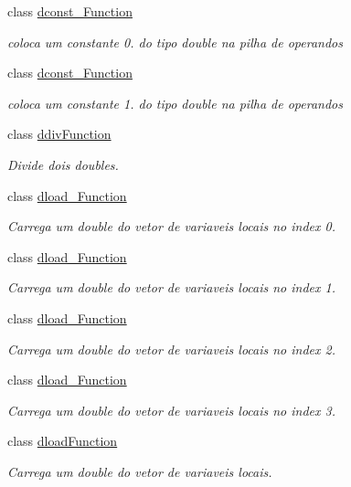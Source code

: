 \begin{DoxyCompactItemize}
class \hyperlink{classInstruction_1_1dconst__0Function}{dconst\+\_\+Function}
\begin{DoxyCompactList}\small\item\em coloca um constante 0. do tipo double na pilha de operandos \end{DoxyCompactList}\item 
class \hyperlink{classInstruction_1_1dconst__1Function}{dconst\+\_\+Function}
\begin{DoxyCompactList}\small\item\em coloca um constante 1. do tipo double na pilha de operandos \end{DoxyCompactList}\item 
class \hyperlink{classInstruction_1_1ddivFunction}{ddiv\+Function}
\begin{DoxyCompactList}\small\item\em Divide dois doubles. \end{DoxyCompactList}\item 
class \hyperlink{classInstruction_1_1dload__0Function}{dload\+\_\+Function}
\begin{DoxyCompactList}\small\item\em Carrega um double do vetor de variaveis locais no index 0. \end{DoxyCompactList}\item 
class \hyperlink{classInstruction_1_1dload__1Function}{dload\+\_\+Function}
\begin{DoxyCompactList}\small\item\em Carrega um double do vetor de variaveis locais no index 1. \end{DoxyCompactList}\item 
class \hyperlink{classInstruction_1_1dload__2Function}{dload\+\_\+Function}
\begin{DoxyCompactList}\small\item\em Carrega um double do vetor de variaveis locais no index 2. \end{DoxyCompactList}\item 
class \hyperlink{classInstruction_1_1dload__3Function}{dload\+\_\+Function}
\begin{DoxyCompactList}\small\item\em Carrega um double do vetor de variaveis locais no index 3. \end{DoxyCompactList}\item 
class \hyperlink{classInstruction_1_1dloadFunction}{dload\+Function}
\begin{DoxyCompactList}\small\item\em Carrega um double do vetor de variaveis locais. \end{DoxyCompactList}\item 

\end{DoxyCompactItemize}
